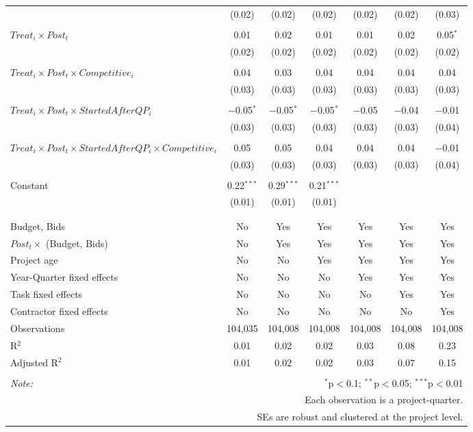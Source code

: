 \documentclass[]{article}
\begin{document}
\begin{table}[H]
\begin{tabular}{@{\extracolsep{-3pt}}lcccccc}
  & (0.02) & (0.02) & (0.02) & (0.02) & (0.02) & (0.03) \\ 
  & & & & & & \\ 
 $Treat_i \times Post_t$ & 0.01 & 0.02 & 0.01 & 0.01 & 0.02 & 0.05$^{*}$ \\ 
  & (0.02) & (0.02) & (0.02) & (0.02) & (0.02) & (0.02) \\ 
  & & & & & & \\ 
 $Treat_i \times Post_t \times Competitive_i$ & 0.04 & 0.03 & 0.04 & 0.04 & 0.04 & 0.04 \\ 
  & (0.03) & (0.03) & (0.03) & (0.03) & (0.03) & (0.03) \\ 
  & & & & & & \\ 
 $Treat_i \times Post_t \times StartedAfterQP_i$ & $-$0.05$^{*}$ & $-$0.05$^{*}$ & $-$0.05$^{*}$ & $-$0.05 & $-$0.04 & $-$0.01 \\ 
  & (0.03) & (0.03) & (0.03) & (0.03) & (0.03) & (0.04) \\ 
  & & & & & & \\ 
 $Treat_i \times Post_t \times StartedAfterQP_i \times Competitive_i$ & 0.05 & 0.05 & 0.04 & 0.04 & 0.04 & $-$0.01 \\ 
  & (0.03) & (0.03) & (0.03) & (0.03) & (0.03) & (0.04) \\ 
  & & & & & & \\ 
 Constant & 0.22$^{***}$ & 0.29$^{***}$ & 0.21$^{***}$ &  &  &  \\ 
  & (0.01) & (0.01) & (0.01) &  &  &  \\ 
  & & & & & & \\ 
\hline \\[-1.8ex] 
Budget, Bids & No & Yes & Yes & Yes & Yes & Yes \\ 
$Post_t \times $  (Budget, Bids) & No & Yes & Yes & Yes & Yes & Yes \\ 
Project age & No & No & Yes & Yes & Yes & Yes \\ 
Year-Quarter fixed effects & No & No & No & Yes & Yes & Yes \\ 
Task fixed effects & No & No & No & No & Yes & Yes \\ 
Contractor fixed effects & No & No & No & No & No & Yes \\ 
Observations & 104,035 & 104,008 & 104,008 & 104,008 & 104,008 & 104,008 \\ 
R$^{2}$ & 0.01 & 0.02 & 0.02 & 0.03 & 0.08 & 0.23 \\ 
Adjusted R$^{2}$ & 0.01 & 0.02 & 0.02 & 0.03 & 0.07 & 0.15 \\ 
\hline 
\hline \\[-1.8ex] 
\textit{Note:}  & \multicolumn{6}{r}{$^{*}$p$<$0.1; $^{**}$p$<$0.05; $^{***}$p$<$0.01} \\ 
 & \multicolumn{6}{r}{Each observation is a project-quarter.} \\ 
 & \multicolumn{6}{r}{SEs are robust and clustered at the project level.} \\ 
\end{tabular} 
\end{table}
\end{document}
